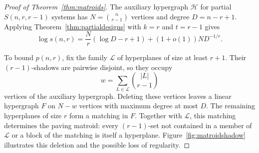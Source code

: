 \documentclass[11pt,reqno]{amsart}
\numberwithin{equation}{section}
\theoremstyle{plain}
\theoremstyle{definition}
\newcommand{\calH}{\mathcal{H}}
\begin{document}
\begin{proof}[Proof of Theorem~\ref{thm:matroids}]
    The auxiliary hypergraph $\calH$ for partial $S(n,r,r-1)$ systems has $N=\binom n{r-1}$ vertices and degree $D=n-r+1$.
    Applying Theorem~\ref{thm:partialdesigns} with $k=r$ and $t=r-1$ gives
    \begin{equation}\label{eq:sparse-paving-count}
        \log s(n,r)=\frac Nr(\log D-r+1)+(1+o(1))ND^{-1/r}.
    \end{equation}

    To bound $p(n,r)$, fix the family $\mathcal L$ of hyperplanes of size at least $r+1$.
    Their $(r-1)$-shadows are pairwise disjoint, so they occupy
    \begin{equation}\label{eq:large-hyperplane-shadow}
        w=\sum_{L\in\mathcal L}\binom{|L|}{r-1}
    \end{equation}
    vertices of the auxiliary hypergraph.
    Deleting these vertices leaves a linear hypergraph $F$ on $N-w$ vertices with maximum degree at most $D$.
    The remaining hyperplanes of size $r$ form a matching in $F$.
    Together with $\mathcal L$, this matching determines the paving matroid: every $(r-1)$-set not contained in a member of $\mathcal L$ or a block of the matching is itself a hyperplane.
    Figure~\ref{fig:matroidshadow} illustrates this deletion and the possible loss of regularity.


\end{proof}
\end{document}
